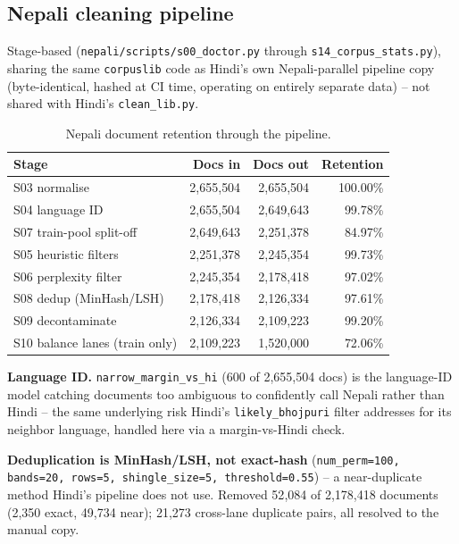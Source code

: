 \documentclass[11pt]{article}
\begin{document}
\subsection{Nepali cleaning pipeline}

Stage-based (\texttt{nepali/scripts/s00\_doctor.py} through
\texttt{s14\_corpus\_stats.py}), sharing the same \texttt{corpuslib} code
as Hindi's own Nepali-parallel pipeline copy (byte-identical, hashed at
CI time, operating on entirely separate data) -- not shared with Hindi's
\texttt{clean\_lib.py}.

\begin{table}[htbp]
\centering
\begin{tabular}{lrrr}
\toprule
Stage & Docs in & Docs out & Retention \\
\midrule
S03 normalise & 2{,}655{,}504 & 2{,}655{,}504 & 100.00\% \\
S04 language ID & 2{,}655{,}504 & 2{,}649{,}643 & 99.78\% \\
S07 train-pool split-off & 2{,}649{,}643 & 2{,}251{,}378 & 84.97\% \\
S05 heuristic filters & 2{,}251{,}378 & 2{,}245{,}354 & 99.73\% \\
S06 perplexity filter & 2{,}245{,}354 & 2{,}178{,}418 & 97.02\% \\
S08 dedup (MinHash/LSH) & 2{,}178{,}418 & 2{,}126{,}334 & 97.61\% \\
S09 decontaminate & 2{,}126{,}334 & 2{,}109{,}223 & 99.20\% \\
S10 balance lanes (train only) & 2{,}109{,}223 & 1{,}520{,}000 & 72.06\% \\
\bottomrule
\end{tabular}
\caption{Nepali document retention through the pipeline.}
\end{table}

\textbf{Language ID.} \texttt{narrow\_margin\_vs\_hi} (600 of 2{,}655{,}504
docs) is the language-ID model catching documents too ambiguous to
confidently call Nepali rather than Hindi -- the same underlying risk
Hindi's \texttt{likely\_bhojpuri} filter addresses for its neighbor
language, handled here via a margin-vs-Hindi check.

\textbf{Deduplication is MinHash/LSH, not exact-hash}
(\texttt{num\_perm=100, bands=20, rows=5, shingle\_size=5,
threshold=0.55}) -- a near-duplicate method Hindi's pipeline does not
use. Removed 52{,}084 of 2{,}178{,}418 documents (2{,}350 exact, 49{,}734
near); 21{,}273 cross-lane duplicate pairs, all resolved to the manual
copy.
\end{document}
